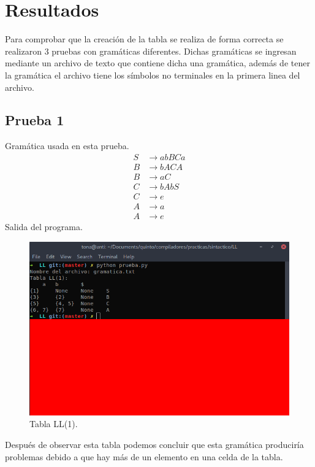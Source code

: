 \documentclass[12pt, titlepage]{article}
\begin{document}
    \newpage
    \section{Resultados}
    Para comprobar que la creación de la tabla se realiza de forma correcta se 
realizaron 3 pruebas con gramáticas diferentes. Dichas gramáticas se ingresan 
mediante un archivo de texto que contiene dicha una gramática, además de tener 
la gramática el archivo tiene los símbolos no terminales en la primera linea 
del archivo.
    \subsection{Prueba 1}
    Gramática usada en esta prueba.
    \setcounter{equation}{0}
    \begin{align}
        S &\rightarrow abBCa \\
        B &\rightarrow bACA \\
        B &\rightarrow aC \\
        C &\rightarrow bAbS \\
        C &\rightarrow e \\
        A &\rightarrow a \\
        A &\rightarrow e
    \end{align}
    Salida del programa.
    \begin{figure}[H]
        \begin{center}
            \includegraphics[width=15cm]{gramatica.png}
            \caption{Tabla LL(1).}
            \label{fig:prueba1}
        \end{center}
    \end{figure}
    Después de observar esta tabla podemos concluir que esta gramática 
produciría problemas debido a que hay más de un elemento en una celda de la 
tabla.
\end{document}
